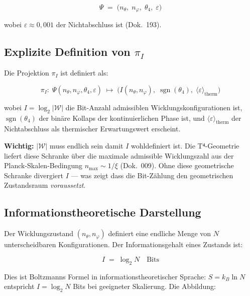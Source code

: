 \begin{equation}
  \Psi \;=\; \bigl(n_\theta,\; n_\varphi,\; \theta_4,\; \varepsilon\bigr)
  \tag{243.1}
\end{equation}

wobei $\varepsilon \approx 0{,}001$ der Nichtabschluss ist
(Dok.~193).

\subsection{\texorpdfstring{Explizite Definition von $\pi_I$}{Explizite Definition von pi\_I}}

Die Projektion $\pi_I$ ist definiert als:

\begin{equation}
  \pi_I:\; \Psi(n_\theta, n_\varphi, \theta_4, \varepsilon)
  \;\longmapsto\;
  \bigl(I(n_\theta, n_\varphi),\;\operatorname{sgn}(\theta_4),\;
        \langle\varepsilon\rangle_\text{therm}\bigr)
  \tag{243.2a}
\end{equation}

wobei $I = \log_2|\mathcal{W}|$ die Bit-Anzahl admissiblen Wicklungs\-konfigurationen
ist, $\operatorname{sgn}(\theta_4)$ der binäre Kollaps der kontinuierlichen
Phase ist, und $\langle\varepsilon\rangle_\text{therm}$ der Nichtabschluss
als thermischer Erwartungswert erscheint.

\textbf{Wichtig:} $|\mathcal{W}|$ muss endlich sein damit $I$ wohldefiniert ist.
Die T⁴-Geometrie liefert diese Schranke über die maximale admissible
Wicklungszahl aus der Planck-Skalen-Bedingung $n_\text{max} \sim 1/\xi$
(Dok.~009). Ohne diese geometrische Schranke divergiert $I$ --- was zeigt
dass die Bit-Zählung den geometrischen Zustandsraum \emph{voraussetzt}.

\subsection{Informationstheoretische Darstellung}

Der Wicklungszustand $(n_\theta, n_\varphi)$ definiert eine endliche
Menge von $N$ unterscheidbaren Konfigurationen. Der Informationsgehalt
eines Zustands ist:

\begin{equation}
  I \;=\; \log_2 N \quad \text{Bits}
  \tag{243.2}
\end{equation}

Dies ist Boltzmanns Formel in informationstheoretischer Sprache:
$S = k_B \ln N$ entspricht $I = \log_2 N$ Bits bei geeigneter
Skalierung. Die Abbildung:


